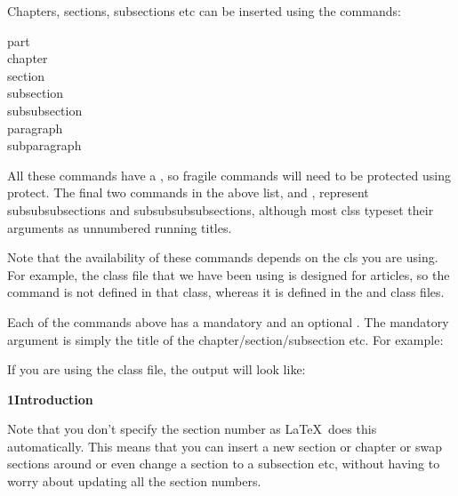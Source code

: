 Chapters, sections, subsections etc can be inserted using the
commands:
\begin{definition}
\gls{part}\\
\gls{chapter}\\
\gls{section}\\
\gls{subsection}\\
\gls{subsubsection}\\
\gls{paragraph}\\
\gls{subparagraph}
\end{definition}%
All these commands have a , so fragile commands will need to
be protected using \gls{protect}. The final two commands in the
above list,  and , represent
subsubsubsections and subsubsubsubsections, although most
\glspl{cls} typeset their arguments as unnumbered running titles.

Note that the availability of these commands depends on the
\gls{cls} you are using. For example, the  class
file that we have been using is designed for articles, so the
 command is not defined in that class, whereas it is
defined in the  and  class files.

Each of the commands above has a \gls{mandatory}  and an
\gls{optional} . The mandatory argument
 is simply the title of the chapter\slash section\slash subsection
etc. For
example:
\begin{codeS}
\end{codeS}%
If you are using the  class file, the output will look 
like:
\begin{resultS}
\textbf{\sffamily\Large 1\quad Introduction}
\end{resultS}%
Note that you don't specify the section number as \LaTeX\ does this
automatically.  This means that you can insert a new section or
chapter or swap sections around or even change a section to a
subsection etc, without having to worry about updating all the
section numbers.

